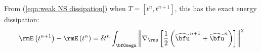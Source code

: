 \begin{example}
        From (\ref{eqn:weak NS dissipation}) when $T  =  [t^{n}, t^{n + 1}]$, this has the exact energy dissipation:
        \begin{equation}
            \rmE\left(t^{n + 1}\right)  -  \rmE\left(t^{n}\right)  =  \delta t^{n}\int_{\bfOmega}\left\|\nabla_{\rms}\left[\frac{1}{2}\left(\widehat{\bfu}^{n + 1} + \widehat{\bfu}^{n}\right)\right]\right\|^{2}
        \end{equation}
    \end{example}
